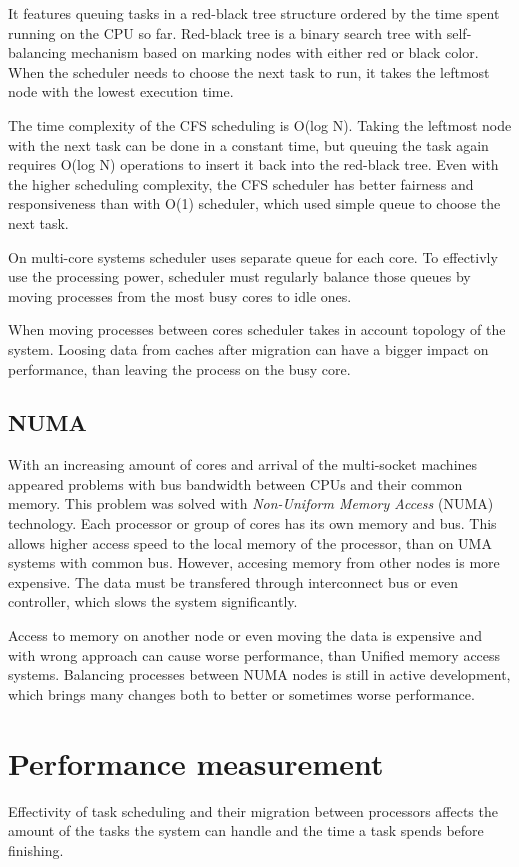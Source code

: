 It features queuing tasks in a red-black tree structure ordered by the time spent
running on the CPU so far. Red-black tree is a binary search
tree with self-balancing mechanism based on marking nodes with either red or
black color.
When the scheduler needs to choose the next task to run, it
takes the leftmost node with the lowest execution time. 

The time complexity of the CFS scheduling is O(log N). Taking the leftmost node with
the next task can be done in a constant time, but queuing the task again requires
O(log N) operations to insert it back into the red-black tree. Even with the
higher scheduling complexity, the CFS scheduler has better fairness and
responsiveness than with O(1) scheduler, which used simple queue to choose the
next task.

On multi-core systems scheduler uses separate queue for each core. To effectivly
use the processing power, scheduler must regularly balance those queues by
moving processes from the most busy cores to idle ones.

When moving processes between cores scheduler takes in account topology of the
system. Loosing data from caches after migration can have a bigger impact on
performance, than leaving the process on the busy core.

\section{NUMA}
With an increasing amount of cores and arrival of the multi-socket machines
appeared problems with bus bandwidth between CPUs and their common memory. This
problem was solved with \emph{Non-Uniform Memory Access} (NUMA) technology.
Each processor or group of cores has its own memory and bus. This allows higher
access speed to the local memory of the processor, than on UMA systems with
common bus. However, accesing memory from other nodes is more expensive. The
data must be transfered through interconnect bus or even controller, which slows
the system significantly.

Access to memory on another node or even moving the data is expensive and with
wrong approach can cause worse performance, than Unified memory access systems.
Balancing processes between NUMA nodes is still in active development, which
brings many changes both to better or sometimes worse performance.


\chapter{Performance measurement}
Effectivity of task scheduling and their migration between processors affects
the amount of the tasks the system can handle and the time a task spends before
finishing.

